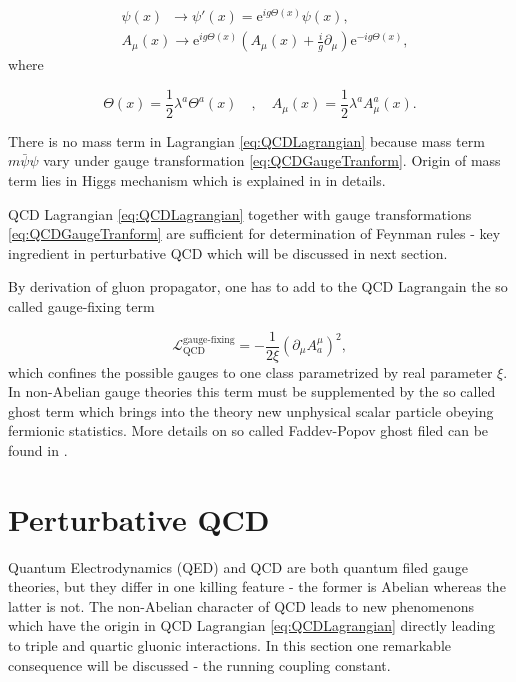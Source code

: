 \documentclass[a4paper,11pt]{report}
\newcommand{\Euler}{\mathrm{e}}
\begin{document}
\begin{align}
  &\psi(x) \, \, \, \rightarrow \psi'(x) = \Euler^{ig\Theta(x)} \psi(x),
    \label{eq:QCDGaugeTranform} \\
  &A_\mu(x) \rightarrow \Euler^{ig\Theta(x)} \left( A_\mu(x) +
    \frac{i}{g}\partial_\mu \right) \Euler^{-ig\Theta(x)}, 
  \nonumber
\end{align}
where

\begin{equation}
  \Theta(x) = \frac{1}{2} \lambda^a \Theta^a(x) 
  \quad , \quad
  A_\mu(x) = \frac{1}{2} \lambda^a A_\mu^a(x).
  \label{eq:QCDAdditionalFunctions}
\end{equation}

There is no mass term in Lagrangian \eqref{eq:QCDLagrangian} because mass term
$m\bar{\psi}\psi$ vary under gauge transformation
\eqref{eq:QCDGaugeTranform}. Origin of mass term lies in Higgs mechanism
\cite{HiggsMechanism} which is explained in \cite{horejsi2002fundamentals} in
details.

QCD Lagrangian \eqref{eq:QCDLagrangian} together with gauge transformations
\eqref{eq:QCDGaugeTranform} are sufficient for determination of Feynman rules -
key ingredient in perturbative QCD which will be discussed in next section.

By derivation of gluon propagator, one has to add to the QCD Lagrangain the so
called gauge-fixing term

\begin{equation}
  \mathscr{L}_{\text{QCD}}^{\text{gauge-fixing}} = - \frac{1}{2\xi} \left( \partial_\mu A_a^\mu
  \right)^2,
  \label{eq:QCDGaugeFixingTerm}
\end{equation}
which confines the possible gauges to one class parametrized by real parameter
$\xi$. In non-Abelian gauge theories this term must be supplemented by the so
called ghost term which brings into the theory new unphysical scalar particle
obeying fermionic statistics. More details on so called Faddev-Popov ghost filed
can be found in \cite{FaddeevPopovGhosts}.


\section{Perturbative QCD}

Quantum Electrodynamics (QED) and QCD are both quantum filed gauge theories, but
they differ in one killing feature - the former is Abelian whereas the latter is
not. The non-Abelian character of QCD leads to new phenomenons which have the origin in QCD
Lagrangian \eqref{eq:QCDLagrangian} directly leading to triple and quartic
gluonic interactions. In this section one remarkable consequence will be
discussed - the running coupling constant.
\end{document}
